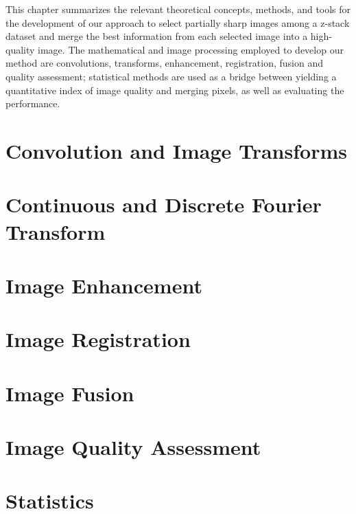 
This chapter summarizes the relevant theoretical concepts, methods, and tools for the development of our approach to select partially sharp images among a z-stack dataset and merge the best information from each selected image into a high-quality image. The mathematical and image processing employed to develop our method are convolutions, transforms, enhancement, registration, fusion and quality assessment; statistical methods are used as a bridge between yielding a quantitative index of image quality and merging pixels, as well as evaluating the performance.

\section{Convolution and Image Transforms}


\section{Continuous and Discrete Fourier Transform}


\section{Image Enhancement}


\section{Image Registration}


\section{Image Fusion}


\section{Image Quality Assessment}


\section{Statistics}
